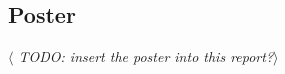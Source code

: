 \documentclass[12pt]{article}
\begin{document}
\begin{appendix}
    \subsection{Poster}
      \textit{$\langle$ TODO: insert the poster into this report?$\rangle$}

\end{appendix}
\end{document}
